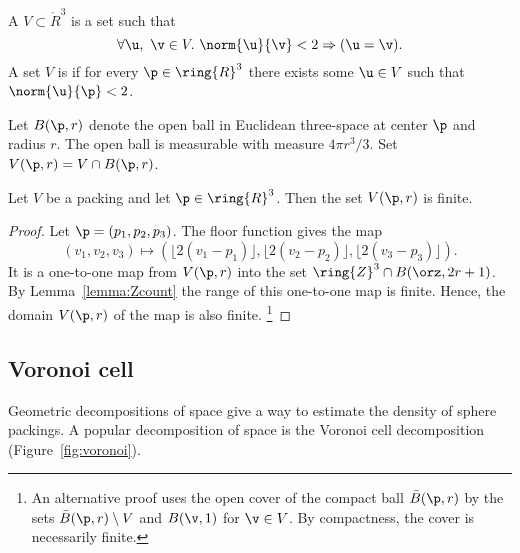 \figDEQCVQL %

\begin{definition} 
A  $ V\subset \ring{R}^3$ is a set such that
\[ 
\forall  \u,~\v\in  V.~  \norm{ \u}{\v} < 2 \Rightarrow ( \u=\v).
\]  
A set $V$ is  if for every $\p\in\ring{R}^3$ there
exists some $ \u\in V$ such that $\norm{ \u}{\p}< 2$.
\end{definition}
%
%



Let $B(\p,r)$ denote the open ball in
Euclidean three-space at center $\p$ and radius $r$.  The open ball
is measurable with measure $4\pi r^3/3$.
 Set $ V(\p,r) = V \cap
B(\p,r)$. %
%
%
%

\begin{lemma}[]
\label{lemma:V-finite}
Let $ V$ be a packing and let $\p\in\ring{R}^3$.
Then the set $ V(\p,r)$ is finite.
\end{lemma}

\begin{proof}  Let $\p = (p_1,p_2,p_3)$. The floor function gives the map
\[ (v_1,v_2,v_3)\mapsto (\lfloor 2(v_1-p_1)
  \rfloor, \lfloor 2(v_2-p_2) \rfloor, \lfloor 2(v_3-p_3) \rfloor).
\] 
It is a one-to-one map from $ V(\p,r)$ into the set $\ring{Z}^3\cap
B(\orz,2r + 1)$.  By Lemma~\ref{lemma:Zcount} the range of this
one-to-one map is finite.  Hence, the domain $ V(\p,r)$ of the map is
also finite.%
\footnote{An alternative proof uses the open cover of the compact ball
  $\bar B(\p,r)$ by the sets $\bar B(\p,r)\setminus V$ and $B(\v,1)$
  for $\v\in V$. By compactness, the cover is necessarily finite.}
\end{proof}






\subsection{Voronoi cell}

Geometric decompositions of space give a way to estimate the density
of sphere packings.  A popular decomposition of space
is the Voronoi cell decomposition (Figure~\ref{fig:voronoi}).

